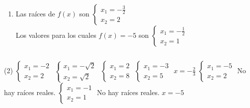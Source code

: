 \documentclass{article}
\begin{document}
\begin{enumerate}[label=\textsc{\roman*}.]
{\begin{enumerate}[label=\arabic*.]
\begin{enumerate}[label=\alph*)]
                    \item $f(0.5) = -6$
                    \item $f(-\frac{1}{2}) = -5$
                    \item $f(\sqrt 2) = -2 - \sqrt2$
                  \end{enumerate}
            \item Las raíces de $f(x)$ son $\left\{\begin{array}{lr} x_1 =  -\frac{3}{2} \\ x_2 = 2 \end{array} \right.$
            \\ Los valores para los cuales $f(x) = -5$ son $\left\{\begin{array}{lr} x_1 =  -\frac{1}{2} \\ x_2 = 1 \end{array} \right.$
        \end{enumerate}
        
        \newpage
        
        \item $\;$
        \begin{tasks}[style=enumerate, after-item-skip=4mm, label = {\alph*)}](2)
            \task  $\left\{\begin{array}{lr} x_1 =  -2 \\ x_2 = 2 \end{array} \right.$
            \task  $\left\{\begin{array}{lr} x_1 =  -\sqrt2 \\ x_2 = \sqrt2 \end{array} \right.$
            \task  $\left\{\begin{array}{lr} x_1 =  2 \\ x_2 = 8 \end{array} \right.$
            \task  $\left\{\begin{array}{lr} x_1 =  -3 \\ x_2 = 5 \end{array} \right.$
            \task  $x = -\frac{2}{3}$
            \task  $\left\{\begin{array}{lr} x_1 =  -5 \\ x_2 = 2 \end{array} \right.$
            \task  No hay raíces reales.
            \task  $\left\{\begin{array}{lr} x_1 =  -1 \\ x_2 = 1 \end{array} \right.$
            \task  No hay raíces reales.
            \task  $x = -5$
        \end{tasks}
    }
    

\end{enumerate}
\end{document}

